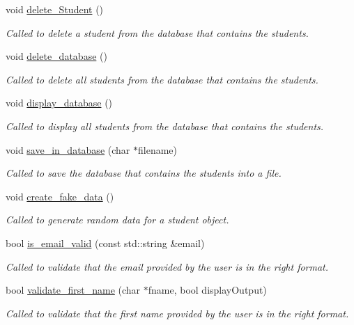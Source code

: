 \begin{DoxyCompactItemize}
void \hyperlink{class_u_i_a1142e1e6f15e4c3b76ec7059a17217ad}{delete\-\_\-\-Student} ()
\begin{DoxyCompactList}\small\item\em Called to delete a student from the database that contains the students. \end{DoxyCompactList}\item 
void \hyperlink{class_u_i_a5f9d0f8ea154b8565f0ae0e1c68211d5}{delete\-\_\-database} ()
\begin{DoxyCompactList}\small\item\em Called to delete all students from the database that contains the students. \end{DoxyCompactList}\item 
void \hyperlink{class_u_i_a4fda1ea3638af37950bbaa856d2f3e7f}{display\-\_\-database} ()
\begin{DoxyCompactList}\small\item\em Called to display all students from the database that contains the students. \end{DoxyCompactList}\item 
void \hyperlink{class_u_i_a51905fc070480e000a2c800538c1a692}{save\-\_\-in\-\_\-database} (char $\ast$filename)
\begin{DoxyCompactList}\small\item\em Called to save the database that contains the students into a file. \end{DoxyCompactList}\item 
void \hyperlink{class_u_i_a8725ee1ec4261c11ac4f6be848897e8b}{create\-\_\-fake\-\_\-data} ()
\begin{DoxyCompactList}\small\item\em Called to generate random data for a student object. \end{DoxyCompactList}\item 
bool \hyperlink{class_u_i_a3473cd7249b0b1fbebe2197b1d19281f}{is\-\_\-email\-\_\-valid} (const std\-::string \&email)
\begin{DoxyCompactList}\small\item\em Called to validate that the email provided by the user is in the right format. \end{DoxyCompactList}\item 
bool \hyperlink{class_u_i_affa94e63f64b44b5c23585bf6ee673d7}{validate\-\_\-first\-\_\-name} (char $\ast$fname, bool display\-Output)
\begin{DoxyCompactList}\small\item\em Called to validate that the first name provided by the user is in the right format. \end{DoxyCompactList}\item 

\end{DoxyCompactItemize}
